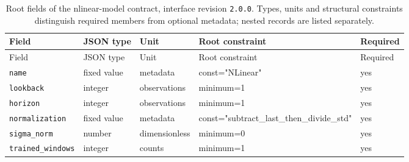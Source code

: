 \begingroup\small
\begin{longtable}{@{}p{}p{}p{}p{}p{}@{}}
\caption{Root fields of the nlinear-model contract, interface revision \texttt{2.0.0}. Types, units and structural constraints distinguish required members from optional metadata; nested records are listed separately.}\label{tab:contract-nlinear-model}\\
\toprule Field & JSON type & Unit & Root constraint & Required\\\midrule\endfirsthead
\toprule Field & JSON type & Unit & Root constraint & Required\\\midrule\endhead
\texttt{name} & fixed value & metadata & const="NLinear" & yes\\
\texttt{lookback} & integer & observations & minimum=1 & yes\\
\texttt{horizon} & integer & observations & minimum=1 & yes\\
\texttt{normalization} & fixed value & metadata & const="subtract\_\allowbreak{}last\_\allowbreak{}then\_\allowbreak{}divide\_\allowbreak{}std" & yes\\
\texttt{sigma\_\allowbreak{}norm} & number & dimensionless & minimum=0 & yes\\
\texttt{trained\_\allowbreak{}windows} & integer & counts & minimum=1 & yes\\
\bottomrule
\end{longtable}
\endgroup
